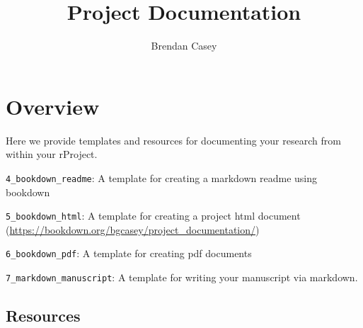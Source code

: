 \documentclass[
]{article}
\title{Project Documentation}
\author{Brendan Casey}
\date{}
\begin{document}
\maketitle

{
\setcounter{tocdepth}{2}
\tableofcontents
}
\hypertarget{overview}{%
\section{Overview}\label{overview}}

Here we provide templates and resources for documenting your research
from within your rProject.

\texttt{4\_bookdown\_readme}: A template for creating a markdown readme
using bookdown

\texttt{5\_bookdown\_html}: A template for creating a project html
document (\url{https://bookdown.org/bgcasey/project_documentation/})

\texttt{6\_bookdown\_pdf}: A template for creating pdf documents

\texttt{7\_markdown\_manuscript}: A template for writing your manuscript
via markdown.

\hypertarget{resources}{%
\subsection*{Resources}\label{resources}}
\end{document}
